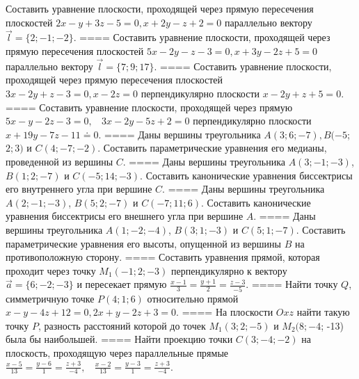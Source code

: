 Составить уравнение плоскости, проходящей через прямую пересечения плоскостей \(2x - y + 3z - 5 = 0,x + 2y - z + 2 = 0\) параллельно вектору \(\overrightarrow{l} = \{ 2; - 1; - 2\}\).
====
Составить уравнение плоскости, проходящей через прямую пересечения плоскостей \(5x - 2y - z - 3 = 0,x + 3y - 2z + 5 = 0\) параллельно вектору \(\overrightarrow{l} = \{ 7;9;17\}\).
====
Составить уравнение плоскости, проходящей через прямую пересечения плоскостей \(3x - 2y + z - 3 = 0,x - 2z = 0\) перпендикулярно плоскости \(x - 2y + z + 5 = 0\).
====
Составить уравнение плоскости, проходящей через прямую \(5x - y - 2z - 3 = 0,\ \ \ \ 3x - 2y - 5z + 2 = 0\) перпендикулярно плоскости \(x + 19y - 7z - 11 \doteq 0\).
====
Даны вершины треугольника \(A(3;6; - 7),B( - 5\); \(2;3)\) и \(C(4; - 7; - 2)\). Составить параметрические уравнения его медианы, проведенной из вершины \(C\).
====
Даны вершины треугольника \(A(3; - 1; - 3)\), \(B(1;2; - 7)\) и \(C( - 5;14; - 3)\). Составить канонические уравнения биссектрисы его внутреннего угла при вершине \(C\).
====
Даны вершины треугольника \(A(2; - 1; - 3)\), \(B(5;2; - 7)\) и \(C( - 7;11;6)\). Составить канонические уравнения биссектрисы его внешнего угла при вершине \(A\).
====
Даны вершины треугольника \(A(1; - 2; - 4)\), \(B(3;1; - 3)\) и \(C(5;1; - 7)\). Составить параметрические уравнения его высоты, опущенной из вершины \(B\) на противоположную сторону.
====
Составить уравнения прямой, которая проходит через точку \(M_{1}( - 1;2; - 3)\) перпендикулярно к вектору \(\overrightarrow{a} = \{ 6; - 2; - 3\}\) и пересекает прямую \(\frac{x - 1}{3} = \frac{y + 1}{2} = \frac{z - 3}{- 5}\).
====
Найти точку \(Q\), симметричную точке \(P(4;1;6)\) относительно прямой \(x - y - 4z + 12 = 0,2x + y - 2z + 3 = 0\).
====
На плоскости \(Oxz\) найти такую точку \(P\), разность расстояний которой до точек \(M_{1}(3;2; - 5)\) и \(M_{2}(8; - 4\); -13) была бы наибольшей.
====
Найти проекцию точки \(C(3; - 4; - 2)\) на плоскость, проходящую через параллельные прямые \(\frac{x - 5}{13} = \frac{y - 6}{1} = \frac{z + 3}{- 4},\ \ \ \ \frac{x - 2}{13} = \frac{y - 3}{1} = \frac{z + 3}{- 4}\).
